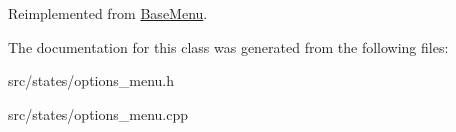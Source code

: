 Reimplemented from \hyperlink{class_base_menu_a4679a8f7c2872606910baa1b08fe0ba1}{Base\-Menu}.



The documentation for this class was generated from the following files\-:\begin{DoxyCompactItemize}
\item 
src/states/options\-\_\-menu.\-h\item 
src/states/options\-\_\-menu.\-cpp\end{DoxyCompactItemize}
